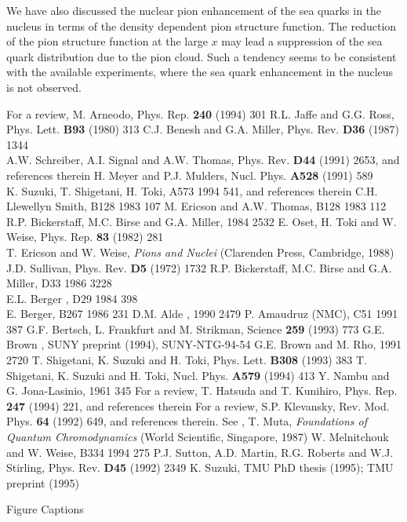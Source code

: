 We have also discussed the nuclear pion enhancement
of the sea quarks in the nucleus in terms of the density dependent pion
structure function.
The reduction of the pion structure function at the large $x$ may
lead a
suppression of the sea quark distribution due to the pion cloud.
Such a tendency seems to be consistent with the available
experiments, where the sea quark enhancement in the nucleus is not
observed.


\newpage
\baselineskip=0.7cm
\begin{thebibliography}{50}
%
For a review, M. Arneodo, Phys. Rep. {\bf 240} (1994) 301
%
R.L. Jaffe and G.G. Ross, Phys. Lett.
{\bf B93} (1980) 313
%
C.J. Benesh and G.A. Miller, Phys. Rev. {\bf D36} (1987)
1344\\
A.W. Schreiber, A.I. Signal and A.W. Thomas, Phys.
Rev. {\bf D44} (1991) 2653, and references therein
%
H. Meyer and P.J. Mulders, Nucl. Phys.
{\bf A528} (1991) 589\\
K. Suzuki, T. Shigetani, H. Toki, \NP A573 1994 541, and references therein
%
C.H. Llewellyn Smith, \PL B128 1983 107
%
M. Ericson and A.W. Thomas, \PL B128 1983 112
%
R.P. Bickerstaff, M.C. Birse and G.A. Miller, 
1984 2532
%
E. Oset, H. Toki and W. Weise, Phys. Rep. {\bf 83} (1982) 281\\
T. Ericson and W. Weise, {\it Pions and Nuclei} (Clarenden Press,
Cambridge, 1988)
%
J.D. Sullivan, Phys. Rev. {\bf D5} (1972) 1732
%
R.P. Bickerstaff, M.C. Birse and G.A. Miller, \PR
D33 1986 3228\\
E.L. Berger {\etal}, \PR D29 1984 398\\
E. Berger, \NP B267 1986 231
%
D.M. Alde {\etal},  1990 2479
%
P. Amaudruz {\etal} (NMC), \ZP C51 1991 387
%
G.F. Bertsch, L. Frankfurt and M. Strikman, Science
{\bf 259} (1993) 773
%
G.E. Brown {\etal}, SUNY preprint (1994), SUNY-NTG-94-54
%
G.E. Brown and M. Rho,  1991 2720
%
T. Shigetani, K. Suzuki and H. Toki, Phys. Lett.
{\bf B308} (1993) 383
%
T. Shigetani, K. Suzuki and H. Toki,
Nucl. Phys. {\bf A579} (1994) 413
%
Y. Nambu and G. Jona-Lasinio,  1961 345
%
For a review, T. Hatsuda and T. Kunihiro, Phys. Rep.
{\bf 247} (1994) 221, and references therein
%
For a review,
S.P. Klevansky, Rev. Mod. Phys. {\bf 64} (1992) 649, and
references therein.
%
See  {\eg}, T. Muta, {\it Foundations of Quantum
Chromodynamics}  (World Scientific, Singapore, 1987)
%
W. Melnitchouk and W. Weise, \PL B334 1994 275
%
P.J. Sutton, A.D. Martin, R.G. Roberts and W.J. Stirling,
Phys. Rev. {\bf D45} (1992) 2349
%
K. Suzuki, TMU PhD thesis (1995); TMU preprint (1995)
%
\end{thebibliography}
%
%
\new
\ni
{\large Figure Captions}

